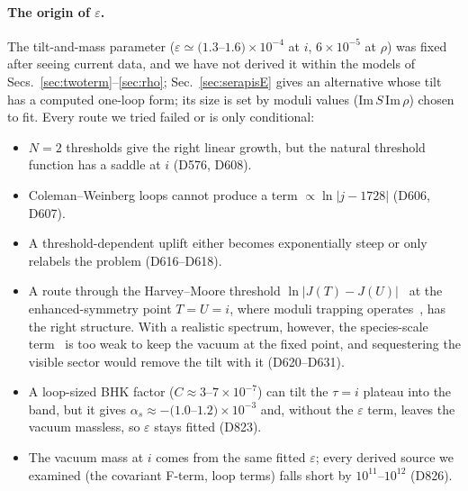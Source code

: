 \documentclass[aps,prd,twocolumn,superscriptaddress,nofootinbib,floatfix]{revtex4-2}
\begin{document}
\paragraph{The origin of $\varepsilon$.} The tilt-and-mass parameter ($\varepsilon \simeq (1.3$--$1.6)\times10^{-4}$ at $i$, $6\times10^{-5}$ at $\rho$) was fixed after seeing current data, and we have not derived it within the models of Secs.~\ref{sec:twoterm}--\ref{sec:rho}; Sec.~\ref{sec:serapisE} gives an alternative whose tilt has a computed one-loop form; its size is set by moduli values ($\mathrm{Im}\,S\,\mathrm{Im}\,\rho$) chosen to fit. Every route we tried failed or is only conditional:
\begin{itemize}
\item $N=2$ thresholds give the right linear growth, but the natural threshold function has a saddle at $i$ (D576, D608).
\item Coleman--Weinberg loops cannot produce a term $\propto\ln|j-1728|$ (D606, D607).
\item A threshold-dependent uplift either becomes exponentially steep or only relabels the problem (D616--D618).
\item A route through the Harvey--Moore threshold $\ln|J(T)-J(U)|$~\cite{arXiv_hep-th_9510182} at the enhanced-symmetry point $T = U = i$, where moduli trapping operates~\cite{arXiv_hep-th_0403001}, has the right structure. With a realistic spectrum, however, the species-scale term~\cite{arXiv_2507_05345} is too weak to keep the vacuum at the fixed point, and sequestering the visible sector would remove the tilt with it (D620--D631).
\item A loop-sized BHK factor ($C\approx3$--$7\times10^{-7}$) can tilt the $\tau=i$ plateau into the band, but it gives $\alpha_s\approx-(1.0$--$1.2)\times10^{-3}$ and, without the $\varepsilon$ term, leaves the vacuum massless, so $\varepsilon$ stays fitted (D823).
\item The vacuum mass at $i$ comes from the same fitted $\varepsilon$; every derived source we examined (the covariant F-term, loop terms) falls short by $10^{11}$--$10^{12}$ (D826).
\end{itemize}
\end{document}
